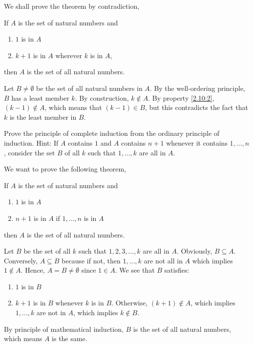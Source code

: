 \begin{solution} \label{2.10} %
  We shall prove the theorem by contradiction,
  \begin{thm}
    If $A$ is the set of natural numbers and
    \begin{enumerate}[label=(\arabic*)]
      \item \label{2.10:1}
      $1$ is in $A$
      \item \label{2.10:2}
      $k+1$ is in $A$ wherever $k$ is in $A$,
    \end{enumerate}
    then $A$ is the set of all natural numbers.
  \end{thm}
  Let $B\neq\emptyset$
  be the set of all natural numbers 
  in $A$. By the well-ordering principle, $B$ has a least
  member $k$. By construction, $k \notin A$. By property
  \ref{2.10:2}, $(k - 1) \notin A$, which means that
  $(k - 1) \in B$, but this contradicts the fact that
  $k$ is the least member in $B$.
\end{solution}

\begin{pr} %
  Prove the principle of complete induction from the ordinary
  principle of induction. Hint: If $A$ contains $1$ and $A$
  contains $n + 1$ whenever it contains $1,\dots,n$,
  consider the set $B$ of all $k$ such that $1,\dots,k$
  are all in $A$.
\end{pr}

\begin{solution} %
  We want to prove the following theorem,
  \begin{thm}
    If $A$ is the set of natural numbers and
    \begin{enumerate}[label=(\arabic*)]
      \item $1$ is in $A$
      \item $n+1$ is in $A$ if $1,\dots,n$ is in $A$
    \end{enumerate}
    then $A$ is the set of all natural numbers.
  \end{thm}
  Let $B$ be the set of all $k$ such that
  $1,2,3,\dots,k$ are all in $A$. Obviously, $B \subseteq A$.
  Conversely, $A \subseteq B$ because if not,
  then $1,\dots,k$ are not all in $A$ which implies
  $1 \notin A$.
  Hence,
  $A = B\neq\emptyset$
  since $1\in A$. We see that $B$ satisfies:
  \begin{enumerate}[label=(\arabic*)]
    \item $1$ is in $B$
    \item $k+1$ is in $B$ whenever $k$ is in $B$. Otherwise,
    $(k+1) \notin A$, which implies $1,\dots,k$
    are not in $A$,
    which implies $k \notin B$.
  \end{enumerate}
  By principle of mathematical induction, $B$ is the set of
  all natural numbers, which means $A$ is the same.
\end{solution}

